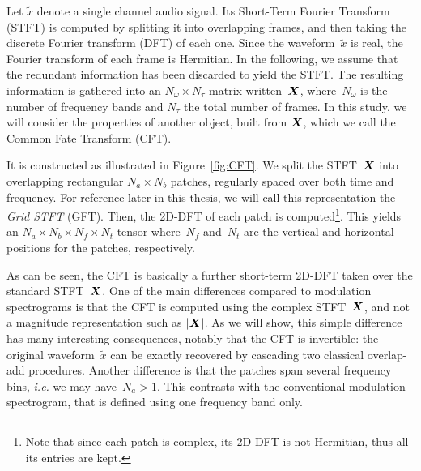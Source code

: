 Let $\tilde{x}$ denote a single channel audio signal.
Its Short-Term Fourier Transform (STFT) is computed by splitting it into overlapping frames, and then taking the discrete Fourier transform (DFT) of each one.
Since the waveform~$\tilde{x}$ is real, the Fourier transform of
each frame is Hermitian. In the following, we assume that the redundant
information has been discarded to yield the STFT.
The resulting information is gathered into an $N_{\omega}\times N_{\tau}$
matrix written~${\bm{X}}$, where~$N_{\omega}$ is the number of frequency
bands and $N_{\tau}$ the total number of frames.
In this study, we will consider the properties of another object, built from ${\bm{X}}$, which we call the Common Fate Transform (CFT).
\par
It is constructed as illustrated in Figure~\ref{fig:CFT}.
We split the STFT~${\bm{X}}$ into overlapping rectangular $N_{a}\times N_{b}$ patches, regularly spaced over both time and frequency.
For reference later in this thesis, we will call this representation the \emph{Grid STFT} (GFT).
Then, the 2D-DFT of each patch is computed\footnote{Note that since each patch is complex, its 2D-DFT is not Hermitian, thus all its entries are kept.}.
This yields an $N_{a}\times N_{b}\times N_{f}\times N_{t}$ tensor where~$N_{f}$ and~$N_{t}$ are the vertical and horizontal positions for the patches, respectively.
\par
As can be seen, the CFT is basically a further short-term 2D-DFT taken over the standard STFT~${\bm{X}}$.
One of the main differences compared to modulation spectrograms is that the CFT is computed using the complex STFT~${\bm{X}}$, and not a magnitude representation such as $\left|{\bm{X}}\right|$.
As we will show, this simple difference has many interesting consequences, notably that the CFT is invertible: the original waveform~$\tilde{x}$ can be exactly recovered by cascading two classical overlap-add procedures.
Another difference is that the patches span several frequency bins, \emph{i.e.} we may have~$N_{a}>1$.
This contrasts with the conventional modulation spectrogram, that is defined using one frequency band only.

